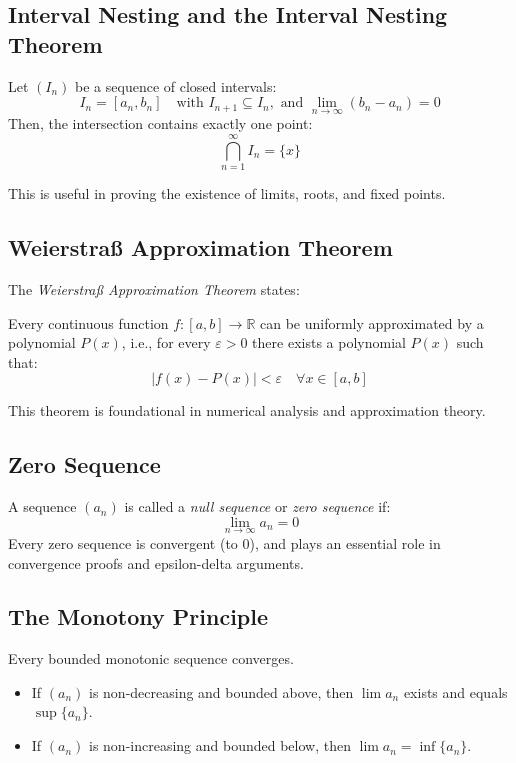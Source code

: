 \subsection{Interval Nesting and the Interval Nesting Theorem}

Let \((I_n)\) be a sequence of closed intervals:
\[
I_n = [a_n, b_n] \quad \text{with } I_{n+1} \subseteq I_n, \text{ and } \lim_{n \to \infty} (b_n - a_n) = 0
\]
Then, the intersection contains exactly one point:
\[
\bigcap_{n=1}^{\infty} I_n = \{x\}
\]

This is useful in proving the existence of limits, roots, and fixed points.

\subsection{Weierstraß Approximation Theorem}

The \emph{Weierstraß Approximation Theorem} states:

Every continuous function \(f: [a, b] \rightarrow \mathbb{R}\) can be uniformly approximated by a polynomial \(P(x)\), i.e., for every \(\varepsilon > 0\) there exists a polynomial \(P(x)\) such that:
\[
|f(x) - P(x)| < \varepsilon \quad \forall x \in [a, b]
\]

This theorem is foundational in numerical analysis and approximation theory.

\subsection{Zero Sequence}

A sequence \((a_n)\) is called a \emph{null sequence} or \emph{zero sequence} if:
\[
\lim_{n \to \infty} a_n = 0
\]
Every zero sequence is convergent (to 0), and plays an essential role in convergence proofs and epsilon-delta arguments.

\subsection{The Monotony Principle}

Every bounded monotonic sequence converges.

\begin{itemize}[label=\(-\)]
\item If \((a_n)\) is non-decreasing and bounded above, then \(\lim a_n\) exists and equals \(\sup \{a_n\}\).
\item If \((a_n)\) is non-increasing and bounded below, then \(\lim a_n = \inf \{a_n\}\).
\end{itemize}

